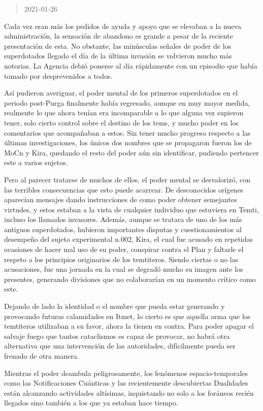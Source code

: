 \documentclass[
  spanish,
]{book}
\begin{document}
\begin{quote}
2021-01-26
\end{quote}

Cada vez eran más los pedidos de ayuda y apoyo que se elevaban a la nueva administración, la sensación de abandono es grande a pesar de la reciente presentación de esta. No obstante, las minúsculas señales de poder de los superdotados llegado el día de la última invasión se volvieron mucho más notorias. La Agencia debió ponerse al día rápidamente con un episodio que había tomado por desprevenidos a todos.

Así pudieron averiguar, el poder mental de los primeros superdotados en el periodo post-Purga finalmente había regresado, aunque en muy mayor medida, realmente lo que ahora tenían era incomparable a lo que alguna vez supieron tener, solo cierto control sobre el destino de los tems, y mucho poder en los comentarios que acompañaban a estos.
Sin tener mucho progreso respecto a las últimas investigaciones, los únicos dos nombres que se propagaron fueron los de MoCn y Kira, quedando el resto del poder aún sin identificar, pudiendo pertencer este a varios sujetos.

Pero al parecer tratarse de muchos de ellos, el poder mental se desvalorizó, con las terribles consecuencias que esto puede acarrear. De desconocidos orígenes aparecían mensajes dando instrucciones de como poder obtener semejantes virtudes, y estos estaban a la vista de cualquier individuo que estuviera en Temti, incluso los llamados invasores. Además, aunque se tratara de uno de los más antiguos superdotados, hubieron importantes disputas y cuestionamientos al desempeño del sujeto experimental n.002, Kira, el cual fue acusado en repetidas ocasiones de hacer mal uso de su poder, conspirar contra el Plan y faltarle el respeto a los principios originarios de los temtiteros. Siendo ciertas o no las acusaciones, fue una jornada en la cual se degradó mucho su imagen ante los presentes, generando divisiones que no colaborarían en un momento crítico como este.

Dejando de lado la identidad o el nombre que pueda estar generando y provocando futuras calamidades en Itmet, lo cierto es que aquella arma que los temtiteros utilizaban a su favor, ahora la tienen en contra. Para poder apagar el salvaje fuego que tantos cataclismos es capaz de provocar, no habrá otra alternativa que una intervención de las autoridades, difícilmente pueda ser frenado de otra manera.

Mientras el poder deambula peligrosamente, los fenómenos espacio-temporales como las Notificaciones Cuánticas y las recientemente descubiertas Dualidades están alcanzando actividades altísimas, inquietando no solo a los foráneos recién llegados sino también a los que ya estaban hace tiempo.
\end{document}
